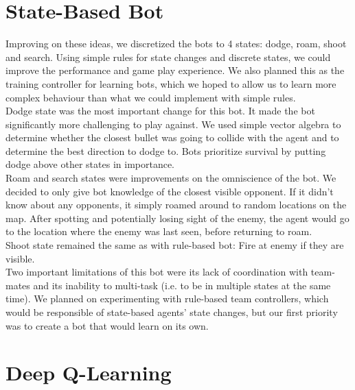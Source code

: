 \documentclass{article}
\begin{document}
	\section{State-Based Bot}
	Improving on these ideas, we discretized the bots to 4 states: dodge, roam, shoot and search. Using simple rules for state changes and discrete states, we could improve the performance and game play experience. We also planned this as the training controller for learning bots, which we hoped to allow us to learn more complex behaviour than what we could implement with simple rules. \\
	Dodge state was the most important change for this bot. It made the bot significantly more challenging to play against. We used simple vector algebra to determine whether the closest bullet was going to collide with the agent and to determine the best direction to dodge to. Bots prioritize survival by putting dodge above other states in importance. \\
	Roam and search states were improvements on the omniscience of the bot. We decided to only give bot knowledge of the closest visible opponent. If it didn't know about any opponents, it simply roamed around to random locations on the map. After spotting and potentially losing sight of the enemy, the agent would go to the location where the enemy was last seen, before returning to roam. \\
	Shoot state remained the same as with rule-based bot: Fire at enemy if they are visible. \\
	Two important limitations of this bot were its lack of coordination with team-mates and its inability to multi-task (i.e. to be in multiple states at the same time). We planned on experimenting with rule-based team controllers,  which would be responsible of state-based agents' state changes, but our first priority was to create a bot that would learn on its own.
	
	
	\section{Deep Q-Learning}
	
	
	
\end{document}
